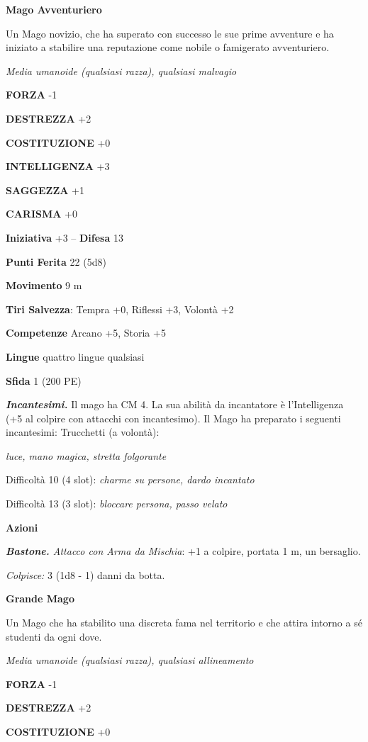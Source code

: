 \begin{multicols}{2}
\medskip\textbf{Mago Avventuriero}

Un Mago novizio, che ha superato con successo le sue prime avventure e ha iniziato a stabilire una reputazione come nobile o famigerato avventuriero.

\emph{Media umanoide (qualsiasi razza), qualsiasi malvagio}

\textbf{FORZA} -1

\textbf{DESTREZZA} +2

\textbf{COSTITUZIONE} +0

\textbf{INTELLIGENZA} +3

\textbf{SAGGEZZA} +1

\textbf{CARISMA} +0

\textbf{Iniziativa} +3 -- \textbf{Difesa} 13

\textbf{Punti Ferita} 22 (5d8)

\textbf{Movimento} 9 m

\textbf{Tiri Salvezza}: Tempra +0, Riflessi +3, Volontà +2 

\textbf{Competenze} Arcano +5, Storia +5

\textbf{Lingue} quattro lingue qualsiasi

\textbf{Sfida} 1 (200 PE)

\emph{\textbf{Incantesimi.}} Il mago ha CM 4. La sua abilità da incantatore è l'Intelligenza (+5 al colpire con attacchi con incantesimo). Il Mago ha preparato i seguenti incantesimi: Trucchetti (a volontà): 

\emph{luce, mano magica, stretta folgorante}

Difficoltà 10 (4 slot): \emph{charme su persone, dardo incantato}

Difficoltà 13 (3 slot): \emph{bloccare persona, passo velato}

\textbf{Azioni}

\emph{\textbf{Bastone.} Attacco con Arma da Mischia}: +1 a colpire, portata 1 m, un bersaglio.

\emph{Colpisce:} 3 (1d8 - 1) danni da botta.

\medskip\textbf{Grande Mago}

Un Mago che ha stabilito una discreta fama nel territorio e che attira intorno a sé studenti da ogni dove.

\emph{Media umanoide (qualsiasi razza), qualsiasi allineamento}

\textbf{FORZA} -1

\textbf{DESTREZZA} +2

\textbf{COSTITUZIONE} +0


\end{multicols}
